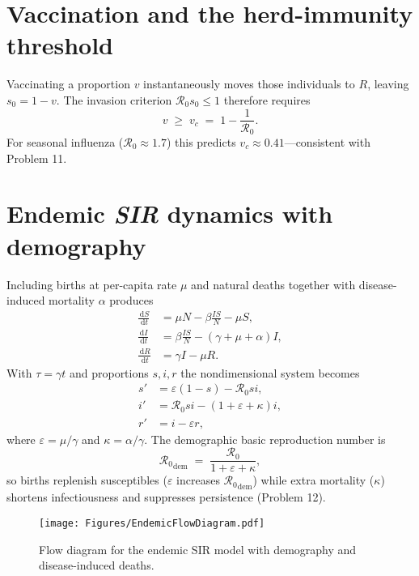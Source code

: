 \documentclass[11pt]{article}
\newcommand{\dd}{\,\mathrm{d}}
\newcommand{\RR}{\mathcal{R}_0}
\begin{document}
\section{Vaccination and the herd-immunity threshold}\label{sec:Vaccination}

Vaccinating a proportion $v$ instantaneously moves those individuals to
$R$, leaving $s_0=1-v$.  The invasion criterion $\RR s_0\le1$ therefore
requires
\begin{equation*}
  v \;\ge\; v_c \;=\; 1-\frac{1}{\RR}.
\end{equation*}
For seasonal influenza ($\RR\approx1.7$) this predicts
$v_c\approx0.41$—consistent with Problem 11.

\section{Endemic \textit{SIR} dynamics with demography}\label{sec:Endemic}

Including births at per-capita rate $\mu$ and natural deaths together
with disease-induced mortality $\alpha$ produces
\begin{align*}
  \frac{\dd S}{\dd t} &= \mu N - \beta \frac{I S}{N} - \mu S, \\
  \frac{\dd I}{\dd t} &= \beta \frac{I S}{N} - (\gamma+\mu+\alpha)I, \\
  \frac{\dd R}{\dd t} &= \gamma I - \mu R .
\end{align*}
With $\tau=\gamma t$ and proportions
$s,i,r$ the nondimensional system becomes
\begin{align*}
  s' &= \varepsilon(1-s) - \RR s i, \\
  i' &= \RR s i - (1+\varepsilon+\kappa)i, \\
  r' &= i - \varepsilon r,
\end{align*}
where $\varepsilon=\mu/\gamma$ and $\kappa=\alpha/\gamma$.
The demographic basic reproduction number is
\begin{equation}\label{eq:R0dem}
  {\RR}_{\mathrm{dem}}
  \;=\;
  \frac{\RR}{1+\varepsilon+\kappa},
\end{equation}
so births replenish susceptibles ($\varepsilon$ increases
${\RR}_{\mathrm{dem}}$) while extra mortality ($\kappa$) shortens
infectiousness and suppresses persistence (Problem 12).

\begin{figure}[H]
  \centering
  \texttt{[image: Figures/EndemicFlowDiagram.pdf]}
  \caption{Flow diagram for the endemic SIR model with demography and
           disease-induced deaths.}
  \label{fig:flowdiagram}
\end{figure}



\end{document}
